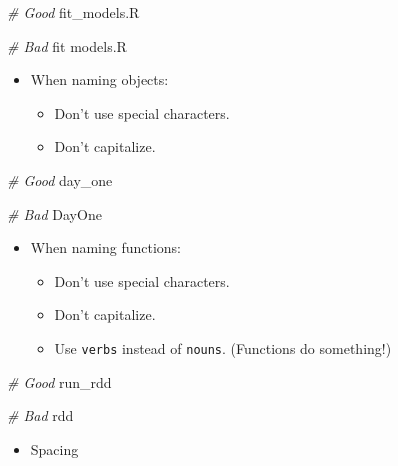 \documentclass[
]{book}
\newenvironment{Shaded}{\begin{snugshade}}{\end{snugshade}}
\newcommand{\CommentTok}[1]{\textcolor[rgb]{0.56,0.35,0.01}{\textit{#1}}}
\newcommand{\NormalTok}[1]{#1}
\providecommand{\tightlist}{%
  \setlength{\itemsep}{0pt}\setlength{\parskip}{0pt}}
\begin{document}
\begin{Shaded}
\begin{Highlighting}[]
\CommentTok{\# Good}
\NormalTok{fit\_models.R}

\CommentTok{\# Bad}
\NormalTok{fit models.R}
\end{Highlighting}
\end{Shaded}

\begin{itemize}
\tightlist
\item
  When naming objects:

  \begin{itemize}
  \tightlist
  \item
    Don't use special characters.
  \item
    Don't capitalize.
  \end{itemize}
\end{itemize}

\begin{Shaded}
\begin{Highlighting}[]
\CommentTok{\# Good }
\NormalTok{day\_one}
    
\CommentTok{\# Bad }
\NormalTok{DayOne}
\end{Highlighting}
\end{Shaded}

\begin{itemize}
\tightlist
\item
  When naming functions:

  \begin{itemize}
  \tightlist
  \item
    Don't use special characters.
  \item
    Don't capitalize.
  \item
    Use \texttt{verbs} instead of \texttt{nouns}. (Functions do something!)
  \end{itemize}
\end{itemize}

\begin{Shaded}
\begin{Highlighting}[]
\CommentTok{\# Good }
\NormalTok{run\_rdd }

\CommentTok{\# Bad }
\NormalTok{rdd}
\end{Highlighting}
\end{Shaded}

\begin{itemize}
\tightlist
\item
  Spacing
\end{itemize}
\end{document}
